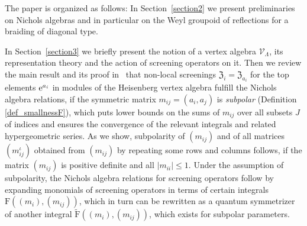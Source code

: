 \documentclass[10pt,a4paper]{amsart}
\numberwithin{equation}{section}
\newcommand{\zem}{\mathfrak{Z}}
\begin{document}
The paper is organized as follows:
In Section~\ref{section2} we present preliminaries on Nichols algebras and in particular on the Weyl groupoid of reflections for a braiding of diagonal type.

In Section~\ref{section3} we briefly present the notion of a vertex algebra $\mathcal{V}_\Lambda$, its representation theory
and the action of screening operators on it. Then we review the main result and its proof in~\cite{Len17} that non-local screenings $\zem_i=\zem_{a_i}$ for the top elements ${\rm e}^{a_i}$ in modules of the Heisenberg vertex algebra fulfill the Nichols algebra relations, if the symmetric matrix $m_{ij}=(a_i,a_j)$ is \emph{subpolar} (Definition \ref{def_smallnessF}), which puts lower bounds on the sums of $m_{ij}$ over all subsets $J$ of indices and ensures the convergence of the relevant integrals and related hypergeometric series. As we show, subpolarity of $(m_{ij})$ and of all matrices $(m_{ij}^\iota)$ obtained from $(m_{ij})$ by repeating some rows and columns follows, if the matrix $(m_{ij})$ is positive definite and all $|m_{ii}|\leq 1$. Under the assumption of subpolarity, the Nichols algebra relations for screening operators follow by expanding monomials of screening operators in terms of certain integrals $\mathrm{F}((m_i),(m_{ij}))$, which in turn can be rewritten as a quantum symmetrizer of another integral $\tilde{\mathrm{F}}((m_i),(m_{ij}))$, which exists for subpolar parameters.
\end{document}
